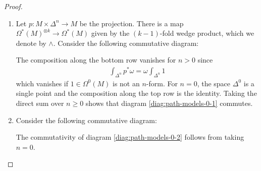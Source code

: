 \documentclass{scrartcl}
\theoremstyle{plain}
\theoremstyle{definition}
\newcommand{\Z}{\mathbb Z}
\DeclareMathOperator{\id}{id}
\begin{document}
\begin{proof}
    \begin{enumerate}
        \item Let $p\colon M\times\Delta^n\to M$ be the projection. There is a map $\Omega^*(M)^{\otimes k}\to \Omega^*(M)$ given by the $(k-1)$-fold wedge product, which we denote by $\wedge$. Consider the following commutative diagram:
\begin{center}
\end{center}

The composition along the bottom row vanishes for $n>0$ since
\begin{align*}
    \int_{\Delta^n} p^*\omega = \omega \int_{\Delta^n} 1
\end{align*}
which vanishes if $1\in \Omega^0(M)$ is not an $n$-form. For $n=0$, the space $\Delta^0$ is a single point and the composition along the top row is the identity. Taking the direct sum over $n\geq 0$ shows that diagram \ref{diag:path-models-0-1} commutes. 

\item Consider the following commutative diagram:
\begin{center}
\end{center}
The commutativity of diagram \ref{diag:path-models-0-2} follows from taking $n=0$. 


\end{enumerate}
\end{proof}
\end{document}
